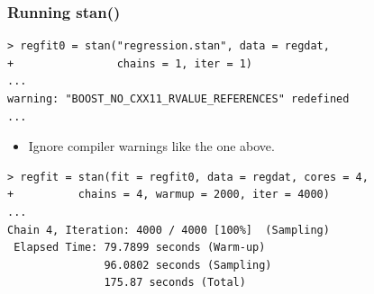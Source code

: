 \documentclass[xcolor=dvipsnames]{beamer}
\begin{document}
\begin{frame}[fragile]
\frametitle{Running stan()}
\begin{verbatim}
> regfit0 = stan("regression.stan", data = regdat,
+                chains = 1, iter = 1)
...
warning: "BOOST_NO_CXX11_RVALUE_REFERENCES" redefined
...
\end{verbatim}
\begin{itemize}
\item Ignore compiler warnings like the one above.
\end{itemize}
\begin{verbatim}
> regfit = stan(fit = regfit0, data = regdat, cores = 4,
+          chains = 4, warmup = 2000, iter = 4000)
...
Chain 4, Iteration: 4000 / 4000 [100%]  (Sampling)
 Elapsed Time: 79.7899 seconds (Warm-up)
               96.0802 seconds (Sampling)
               175.87 seconds (Total)
\end{verbatim}
\end{frame}

\end{document}
